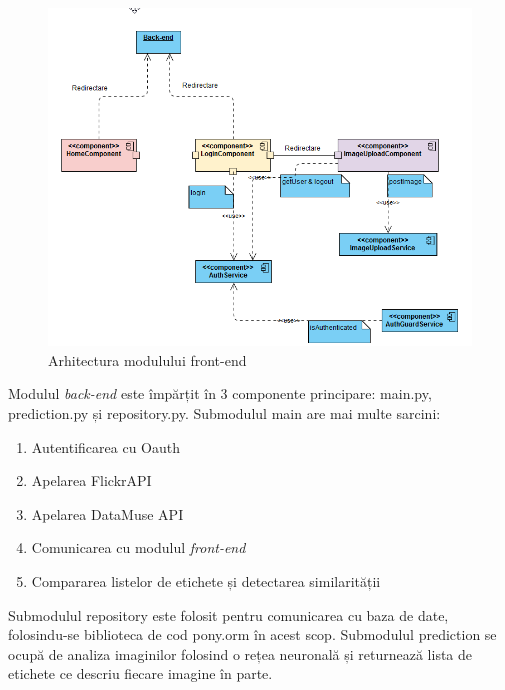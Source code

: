  \begin{figure}[!htbp]
    \begin{center}
        \includegraphics[width=1.0\textwidth]{images/front_end.png}
        \caption{Arhitectura modulului front-end}
    \end{center}
\end{figure}

\pagebreak
Modulul \textit{back-end} este împărțit în 3 componente principare: main.py, prediction.py și repository.py. Submodulul main are mai multe sarcini: 
\begin{enumerate}
    \item Autentificarea cu Oauth
    \item Apelarea FlickrAPI
    \item Apelarea DataMuse API
    \item Comunicarea cu modulul \textit{front-end}
    \item Compararea listelor de etichete și detectarea similarității
\end{enumerate}{}
Submodulul repository este folosit pentru comunicarea cu baza de date, folosindu-se biblioteca de cod pony.orm în acest scop.
Submodulul prediction se ocupă de analiza imaginilor folosind o rețea neuronală și returnează lista de etichete ce descriu fiecare imagine în parte.

